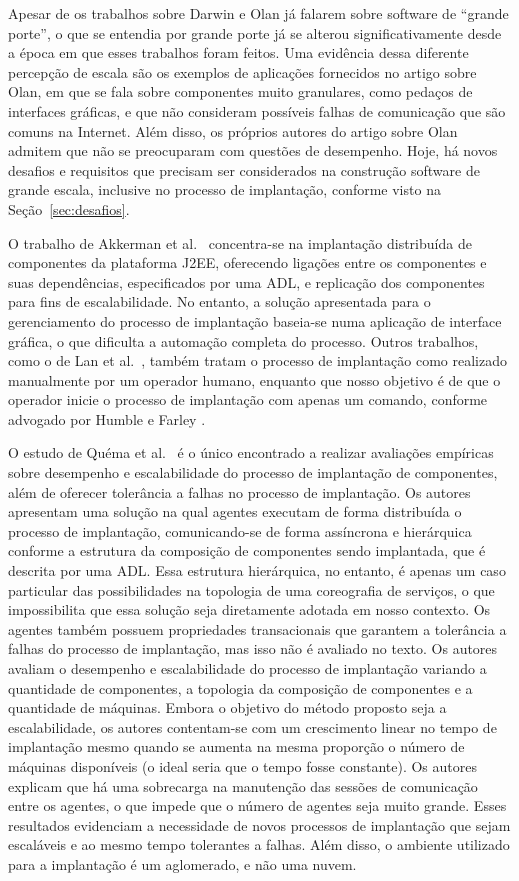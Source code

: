 Apesar de os trabalhos sobre Darwin e Olan já falarem sobre software de ``grande porte'', o que se entendia por grande porte já se alterou significativamente desde a época em que esses trabalhos foram feitos. Uma evidência dessa diferente percepção de escala são os exemplos de aplicações fornecidos no artigo sobre Olan, em que se fala sobre componentes muito granulares, como pedaços de interfaces gráficas, e que não consideram possíveis falhas de comunicação que são comuns na Internet. Além disso, os próprios autores do artigo sobre Olan admitem que não se preocuparam com questões de desempenho. 
Hoje, há novos  desafios e requisitos que precisam ser considerados na construção software de grande escala, inclusive no processo de implantação, conforme visto na Seção~\ref{sec:desafios}.

O trabalho de Akkerman et al.~\cite{Akkerman2005J2EE} concentra-se na implantação distribuída de componentes da plataforma J2EE, oferecendo ligações entre os componentes e suas dependências, especificados por uma ADL, e replicação dos componentes para fins de escalabilidade. No entanto, a solução apresentada para o gerenciamento do processo de implantação baseia-se numa aplicação de interface gráfica, o que dificulta a automação completa do processo. Outros trabalhos, como o de Lan et al.~\cite{Lan2005Architecture}, também tratam o processo de implantação como realizado manualmente por um operador humano, enquanto que nosso objetivo é de que o operador inicie o processo de implantação com apenas um comando, conforme advogado por Humble e Farley \cite{Humble2011Continuous}.

O estudo de Quéma et al.~\cite{quema2004hierarchical} é o único encontrado a realizar avaliações empíricas sobre desempenho e escalabilidade do processo de implantação de componentes, além de oferecer tolerância a falhas no processo de implantação. Os autores apresentam uma solução na qual agentes executam de forma distribuída o processo de implantação, comunicando-se de forma assíncrona e hierárquica conforme a estrutura da composição de componentes sendo implantada, que é descrita por uma ADL. Essa estrutura hierárquica, no entanto, é apenas um caso particular das possibilidades na topologia de uma coreografia de serviços, o que impossibilita que essa solução seja diretamente adotada em nosso contexto. Os agentes também possuem propriedades transacionais que garantem a tolerância a falhas do processo de implantação, mas isso não é avaliado no texto. Os autores avaliam o desempenho e escalabilidade do processo de implantação variando a quantidade de componentes, a topologia da composição de componentes e a quantidade de máquinas. Embora o objetivo do método proposto seja a escalabilidade, os autores contentam-se com um crescimento linear no tempo de implantação mesmo quando se aumenta na mesma proporção o número de máquinas disponíveis (o ideal seria que o tempo fosse constante). Os autores explicam que há uma sobrecarga na manutenção das sessões de comunicação entre os agentes, o que impede que o número de agentes seja muito grande. Esses resultados evidenciam a necessidade de novos processos de implantação que sejam escaláveis e ao mesmo tempo tolerantes a falhas. Além disso, o ambiente utilizado para a implantação é um aglomerado, e não uma nuvem.

